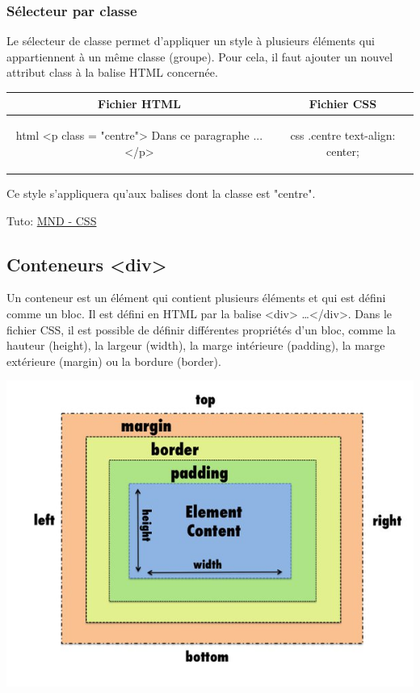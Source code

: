 \documentclass[a4paper,11pt]{article}
\begin{document}
\subsubsection{Sélecteur par classe}
Le sélecteur de classe permet d'appliquer un style à plusieurs éléments qui appartiennent à un même classe (groupe). Pour cela, il faut ajouter un nouvel attribut class à la balise HTML concernée.\par

\begin{tabular}{|c|c|}
\hline
\centering Fichier HTML & Fichier CSS\tabularnewline
\hline
\begin{minipage}{1\textwidth}
\begin{code}{html}
<p class = "centre">
  Dans ce paragraphe ...
</p>
\end{code}
\end{minipage}&
\begin{minipage}{1\textwidth}
\begin{code}{css}
.centre{
  text-align: center;
}
\end{code}
\end{minipage}\tabularnewline
\hline
\end{tabular}\par
Ce style s'appliquera qu'aux balises dont la classe est "centre".

Tuto: \href{https://developer.mozilla.org/fr/docs/Learn/Getting_started_with_the_web/CSS_basics}{MND - CSS}


\subsection{Conteneurs <div>}
\begin{multicols}{2}
\begin{minipage}{1\textwidth}
Un conteneur est un élément qui contient plusieurs éléments et qui est défini comme un bloc.
Il est défini en HTML par la balise <div> \dots </div>. Dans le fichier CSS, il est possible de définir différentes propriétés d'un bloc, comme la hauteur (height), la largeur (width), la marge intérieure (padding), la marge extérieure (margin) ou la bordure (border).
\end{minipage}
\includegraphics[width= 1\textwidth]{images/conteneur.png}
\end{multicols}
\end{document}
